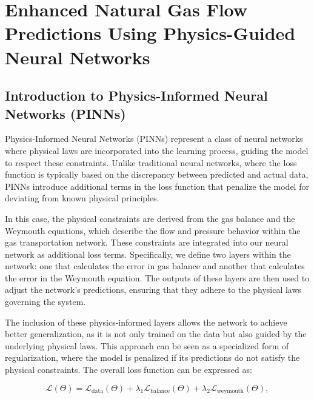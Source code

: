 \chapter{Enhanced Natural Gas Flow Predictions Using Physics-Guided Neural Networks} \label{cap:non_linealcensnet}

\section{Introduction to Physics-Informed Neural Networks (PINNs)}

Physics-Informed Neural Networks (PINNs) represent a class of neural networks where physical laws are incorporated into the learning process, guiding the model to respect these constraints. Unlike traditional neural networks, where the loss function is typically based on the discrepancy between predicted and actual data, PINNs introduce additional terms in the loss function that penalize the model for deviating from known physical principles.

In this case, the physical constraints are derived from the gas balance and the Weymouth equations, which describe the flow and pressure behavior within the gas transportation network. These constraints are integrated into our neural network as additional loss terms. Specifically, we define two layers within the network: one that calculates the error in gas balance and another that calculates the error in the Weymouth equation. The outputs of these layers are then used to adjust the network's predictions, ensuring that they adhere to the physical laws governing the system.

The inclusion of these physics-informed layers allows the network to achieve better generalization, as it is not only trained on the data but also guided by the underlying physical laws. This approach can be seen as a specialized form of regularization, where the model is penalized if its predictions do not satisfy the physical constraints. The overall loss function can be expressed as:


\begin{equation}
   \mathcal{L}(\Theta) = \mathcal{L}_{\text{data}}(\Theta) + \lambda_1 \mathcal{L}_{\text{balance}}(\Theta) + \lambda_2 \mathcal{L}_{\text{weymouth}}(\Theta),     
    \label{eq:PINN_basic_definition}
\end{equation}



